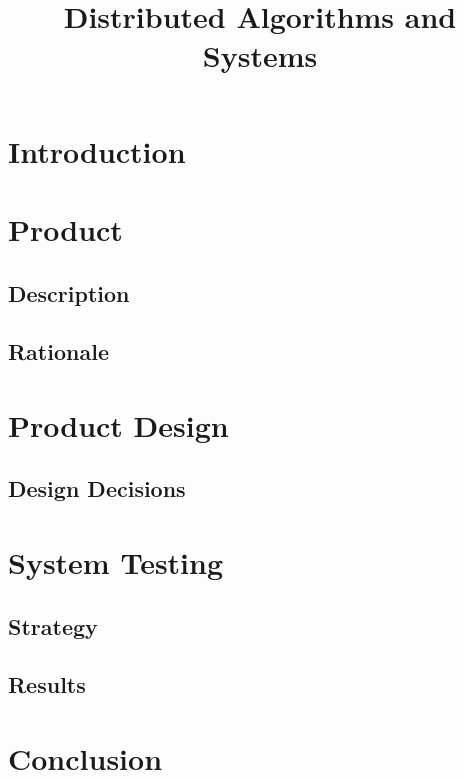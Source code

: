 \documentclass{article}
\title{Distributed Algorithms and Systems}
\begin{document}
\maketitle

\section{Introduction}

\section{Product}
\subsection{Description}
\subsection{Rationale}

\section{Product Design}
\subsection{Design Decisions}

\section{System Testing}
\subsection{Strategy}
\subsection{Results}

\section{Conclusion}
\end{document}
